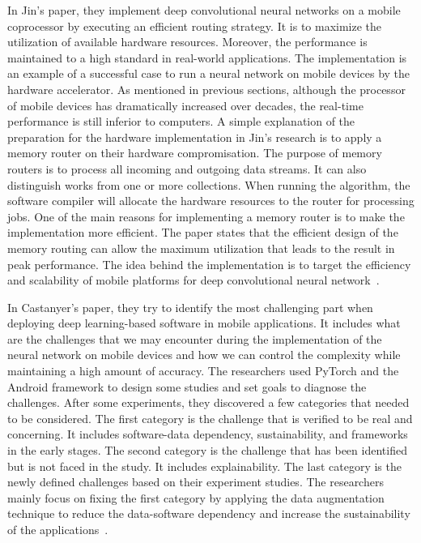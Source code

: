 \documentclass{article}
\begin{document}
In Jin's paper, they implement deep convolutional neural networks on a mobile coprocessor by executing an efficient routing strategy. It is to maximize the utilization of available hardware resources. Moreover, the performance is maintained to a high standard in real-world applications. The implementation is an example of a successful case to run a neural network on mobile devices by the hardware accelerator. As mentioned in previous sections, although the processor of mobile devices has dramatically increased over decades, the real-time performance is still inferior to computers. A simple explanation of the preparation for the hardware implementation in Jin's research is to apply a memory router on their hardware compromisation. The purpose of memory routers is to process all incoming and outgoing data streams. It can also distinguish works from one or more collections. When running the algorithm, the software compiler will allocate the hardware resources to the router for processing jobs. One of the main reasons for implementing a memory router is to make the implementation more efficient. The paper states that the efficient design of the memory routing can allow the maximum utilization that leads to the result in peak performance. The idea behind the implementation is to target the efficiency and scalability of mobile platforms for deep convolutional neural network~\cite{6908370}.

In Castanyer's paper, they try to identify the most challenging part when deploying deep learning-based software in mobile applications. It includes what are the challenges that we may encounter during the implementation of the neural network on mobile devices and how we can control the complexity while maintaining a high amount of accuracy. The researchers used PyTorch and the Android framework to design some studies and set goals to diagnose the challenges. After some experiments, they discovered a few categories that needed to be considered. The first category is the challenge that is verified to be real and concerning. It includes software-data dependency, sustainability, and frameworks in the early stages. The second category is the challenge that has been identified but is not faced in the study. It includes explainability. The last category is the newly defined challenges based on their experiment studies. The researchers mainly focus on fixing the first category by applying the data augmentation technique to reduce the data-software dependency and increase the sustainability of the applications~\cite{cast2020integration}. 

\small

% 
  
\end{document}
